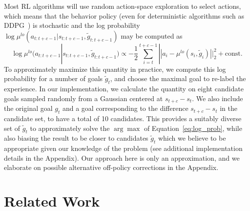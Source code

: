 \documentclass{article}
\begin{document}
Most RL algorithms will use random action-space exploration to select actions, which means that the behavior policy (even for deterministic algorithms such as DDPG~\cite{ddpg}) is stochastic and the log probability $\log \mu^{lo}(a_{t:t+c-1}|s_{t:t+c-1}, \tilde{g}_{t:t+c-1})$ may be computed as
\begin{equation}
\log \mu^{lo}(a_{t:t+c-1}|s_{t:t+c-1}, \tilde{g}_{t:t+c-1}) \propto -\frac{1}{2}\sum_{i=t}^{t+c-1} ||a_i - \mu^{lo}(s_i, \tilde{g}_i)||_2^2 + \text{const}.
\label{eq:log_prob}
\end{equation}
To approximately maximize this quantity in practice, we compute this log probability for a number of goals $\tilde{g}_t$, and choose the maximal goal to re-label the experience.  
In our implementation, we calculate the quantity on eight candidate goals sampled randomly from a Gaussian centered at $s_{t+c} - s_t$.  We also include the original goal $g_t$ and a goal corresponding to the difference $s_{t+c} - s_t$ in the candidate set, to have a total of 10 candidates.  This provides a suitably diverse set of $\tilde{g}_t$ to approximately solve the $\arg\max$ of Equation~\ref{eq:log_prob}, while also biasing the result to be closer to candidates $\tilde{g}_t$ which we believe to be appropriate given our knowledge of the problem (see additional implementation details in the Appendix). 
Our approach here is only an approximation, and we elaborate on possible alternative off-policy corrections in the Appendix.

\section{Related Work}
\end{document}
